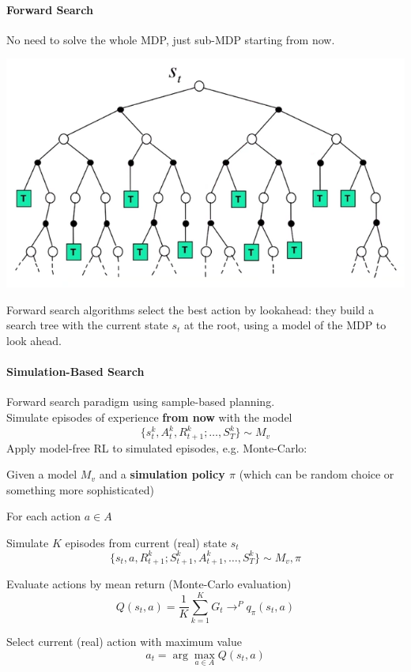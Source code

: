 \documentclass[10pt]{report}
\begin{document}
\paragraph{Forward Search} No need to solve the whole MDP, just sub-MDP starting from now.
\begin{center}
	\includegraphics[scale=0.5]{186.png}
\end{center}
Forward search algorithms select the best action by lookahead: they build a search tree with the current state $s_t$ at the root, using a model of the MDP to look ahead.
\paragraph{Simulation-Based Search} Forward search paradigm using sample-based planning.\\
Simulate episodes of experience \textbf{from now} with the model 
$$\{s_t^k,A_t^k,R_{t+1}^k;\ldots,S_T^k\}\sim M_v$$
Apply model-free RL to simulated episodes, e.g. Monte-Carlo:
\begin{list}{}{}
	\item Given a model $M_v$ and a \textbf{simulation policy $\pi$} (which can be random choice or something more sophisticated)
	\item For each action $a\in A$\begin{list}{}{}
		\item Simulate $K$ episodes from current (real) state $s_t$
		$$\{s_t,a,R_{t+1}^k;S_{t+1}^k,A_{t+1}^k,\ldots,S_T^k\}\sim M_v,\pi$$
		\item Evaluate actions by mean return (Monte-Carlo evaluation)
		$$Q(s_t,a)=\frac{1}{K}\sum_{k=1}^K G_t\rightarrow^P q_\pi(s_t,a)$$
	\end{list}
	\item Select current (real) action with maximum value
	$$a_t=\arg\max_{a\in A} Q(s_t,a)$$
\end{list}
\end{document}
